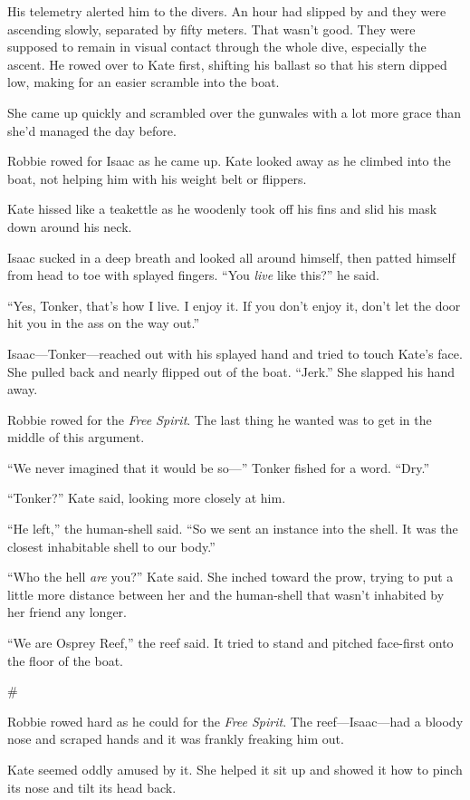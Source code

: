 His telemetry alerted him to the divers. An hour had slipped by and
they were ascending slowly, separated by fifty meters. That wasn’t
good. They were supposed to remain in visual contact through the
whole dive, especially the ascent. He rowed over to Kate first,
shifting his ballast so that his stern dipped low, making for an
easier scramble into the boat.

She came up quickly and scrambled over the gunwales with a lot more
grace than she’d managed the day before.

Robbie rowed for Isaac as he came up. Kate looked away as he
climbed into the boat, not helping him with his weight belt or
flippers.

Kate hissed like a teakettle as he woodenly took off his fins and
slid his mask down around his neck.

Isaac sucked in a deep breath and looked all around himself, then
patted himself from head to toe with splayed fingers. “You
\emph{live} like this?” he said.

“Yes, Tonker, that’s how I live. I enjoy it. If you don’t enjoy it,
don’t let the door hit you in the ass on the way out.”

Isaac—Tonker—reached out with his splayed hand and tried to touch
Kate’s face. She pulled back and nearly flipped out of the boat.
“Jerk.” She slapped his hand away.

Robbie rowed for the \emph{Free Spirit}. The last thing he wanted
was to get in the middle of this argument.

“We never imagined that it would be so—” Tonker fished for a word.
“Dry.”

“Tonker?” Kate said, looking more closely at him.

“He left,” the human-shell said. “So we sent an instance into the
shell. It was the closest inhabitable shell to our body.”

“Who the hell \emph{are} you?” Kate said. She inched toward the
prow, trying to put a little more distance between her and the
human-shell that wasn’t inhabited by her friend any longer.

“We are Osprey Reef,” the reef said. It tried to stand and pitched
face-first onto the floor of the boat.

\#

Robbie rowed hard as he could for the \emph{Free Spirit}. The
reef—Isaac—had a bloody nose and scraped hands and it was frankly
freaking him out.

Kate seemed oddly amused by it. She helped it sit up and showed it
how to pinch its nose and tilt its head back.

